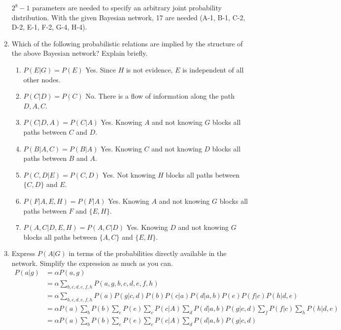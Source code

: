 \documentclass[12pt]{article}
\newenvironment{problem}[2][Problem]{\begin{trivlist}
\item[\hskip \labelsep {\bfseries #1}\hskip \labelsep {\bfseries #2.}]}{\end{trivlist}}
\begin{document}
\begin{problem}{3}
\begin{enumerate}
			 $2^8-1$ parameters are needed to specify an arbitrary joint probability distribution.
			 With the given Bayesian network, 17 are needed (A-1, B-1, C-2, D-2, E-1, F-2, G-4, H-4).
		 \item
			 Which of the following probabilistic relations are implied by the structure of the above Bayesian network? Explain briefly.
			 \begin{enumerate}
				 \item $P(E|G) = P(E)$ Yes. Since $H$ is not evidence, $E$ is independent of all other nodes.
				 \item $P(C|D) = P(C)$ No. There is a flow of information along the path $D,A,C$.
				 \item $P(C|D,A) = P(C|A)$ Yes. Knowing $A$ and not knowing $G$ blocks all paths between $C$ and $D$.
				 \item $P(B|A,C) = P(B|A)$ Yes. Knowing $C$ and not knowing $D$ blocks all paths between $B$ and $A$.
				 \item $P(C,D|E) = P(C,D)$ Yes. Not knowing $H$ blocks all paths between $\{C,D\}$ and $E$.
				 \item $P(F|A,E,H) = P(F|A)$ Yes. Knowing $A$ and not knowing $G$ blocks all paths between $F$ and $\{E,H\}$.
				 \item $P(A,C|D,E,H) = P(A,C|D)$ Yes. Knowing $D$ and not knowing $G$ blocks all paths between $\{A,C\}$ and
					 $\{E,H\}$.
			 \end{enumerate}
		 \item  Express $P(A|G)$ in terms of the probabilities directly available in the network.
			 Simplify the expression as much as you can.
			 \begin{align*}
				 P(a|g)
				 &=\alpha P(a,g) \\
				 & =\alpha \sum_{b,c,d,e,f,h}P(a,g,b,c,d,e,f,h) \\
				 & =\alpha \sum_{b,c,d,e,f,h}P(a)P(g|c,d)P(b)P(c|a)P(d|a,b)P(e)P(f|c)P(h|d,e) \\
				 &=\alpha P(a)\sum_b P(b)\sum_e P(e)\sum_c P(c|A)\sum_d P(d|a,b)P(g|c,d)\sum_f P(f|c) \sum_h P(h|d,e) \\
				 &=\alpha P(a)\sum_b P(b)\sum_e P(e)\sum_c P(c|A)\sum_d P(d|a,b)P(g|c,d)
			 \end{align*}
	 \end{enumerate}
\end{problem}
\end{document}
